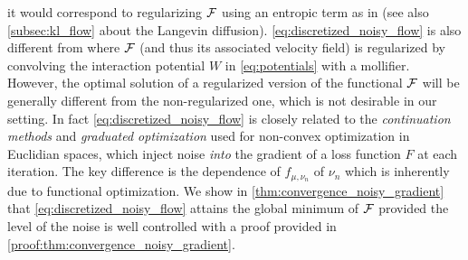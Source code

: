 it would correspond to regularizing ${{\mathcal F}}$ using an entropic term as in \cite{mei2018mean,csimcsekli2018sliced} (see also \cref{subsec:kl_flow} about the Langevin diffusion). \cref{eq:discretized_noisy_flow} is also different from \cite{craig2016blob,carrillo2019blob} where ${{\mathcal F}}$ (and thus its associated velocity field) is regularized by convolving the interaction potential $W$ in \cref{eq:potentials} with a mollifier. However, the optimal solution of a regularized version of the functional ${{\mathcal F}}$ will be generally different from the non-regularized one, which is not desirable in our setting. 
In fact \cref{eq:discretized_noisy_flow} is  closely related to the \textit{continuation methods} \cite{Gulcehre:2016a,Gulcehre:2016,Chaudhari:2017}  and \textit{graduated optimization} \cite{Hazan:2015} used for non-convex optimization in Euclidian spaces, which inject noise \textit{into} the gradient of a loss function $F$ at each iteration. The key difference is the dependence of $f_{\mu,\nu_n}$ of $\nu_n$   which is inherently due to functional optimization.    
We show in \cref{thm:convergence_noisy_gradient} that \cref{eq:discretized_noisy_flow} attains the global minimum of ${{\mathcal F}}$ provided the level of the noise is well controlled with a proof provided in \cref{proof:thm:convergence_noisy_gradient}.
